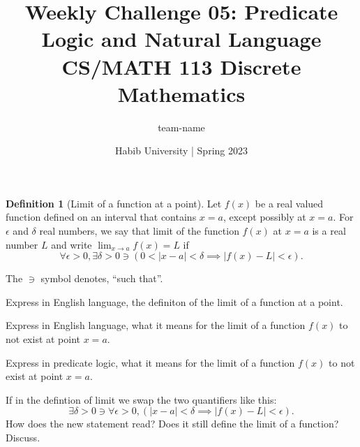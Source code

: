 \documentclass[a4paper]{exam}
\title{Weekly Challenge 05: Predicate Logic and Natural Language\\CS/MATH 113 Discrete Mathematics}
\author{team-name}  %
\date{Habib University | Spring 2023}
\theoremstyle{definition}
\newtheorem{definition}{Definition}
\begin{document}
\maketitle

\begin{questions}

  \begin{definition}[Limit of a function at a point]
    Let $f(x)$ be a real valued function defined on an interval that contains $x=a$, except possibly at $x=a$. For $\epsilon$ and $\delta$ real numbers, we say that limit of the function $f(x)$ at $x=a$ is a real number $L$ and write $\lim_{x \to a} f(x)=L$ if 
    \[
      \forall \epsilon>0, \exists \delta>0 \ni (0<|x-a|<\delta \implies |f(x)-L|<\epsilon).
    \]
  \end{definition}
  The $\ni$ symbol denotes, ``such that''.
  \begin{parts}
  \item Express in English language, the definiton of the limit of a function at a point.
    \begin{solution}
    \end{solution}
  \item Express in English language, what it means for the limit of a function $f(x)$ to not exist at point $x=a$.
    \begin{solution}
    \end{solution}
  \item Express in predicate logic, what it means for the limit of a function $f(x)$ to not exist at point $x=a$.
    \begin{solution}
    \end{solution}
  \item If in the defintion of limit we swap the two quantifiers like this:
    \[
      \exists \delta>0 \ni \forall \epsilon>0, (|x-a|<\delta \implies |f(x)-L|<\epsilon).
    \]
    How does the new statement read? Does it still define the limit of a function? Discuss.
    \begin{solution}
    \end{solution}
  \end{parts}
\end{questions}
\end{document}
